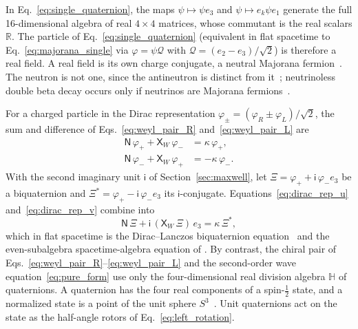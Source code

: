 \documentclass[aps,prd,onecolumn,tightenlines,nofootinbib,notitlepage,11pt,floatfix]{revtex4-2}
\theoremstyle{indentedtheorem}
\begin{document}
In Eq.~\eqref{eq:single_quaternion}, the maps $\psi\mapsto\psi e_3$ and $\psi\mapsto e_k\psi e_1$ generate the full 16-dimensional algebra of real $4\times 4$ matrices, whose commutant is the real scalars $\mathbb{R}$. The particle of Eq.~\eqref{eq:single_quaternion} (equivalent in flat spacetime to Eq.~\eqref{eq:majorana_single} via $\varphi = \psi\mathcal{Q}$ with $\mathcal{Q}=(e_2-e_3)/\sqrt{2}$) is therefore a real field. A real field is its own charge conjugate, a neutral Majorana fermion~\citep{Majorana1937Teoria,ArodzSwierczynski2021Majorana}. The neutron is not one, since the antineutron is distinct from it~\citep{Cork1956Antineutrons}; neutrinoless double beta decay occurs only if neutrinos are Majorana fermions~\citep{Avignone2008Double}.

For a charged particle in the Dirac representation $\varphi_\pm = (\varphi_R\pm\varphi_L)/\sqrt{2}$, the sum and difference of Eqs.~\eqref{eq:weyl_pair_R} and~\eqref{eq:weyl_pair_L} are
\begin{align}
    \mathsf{N} \, \varphi_+ + \mathsf{X}_W \, \varphi_- &= \kappa \, \varphi_+ , \label{eq:dirac_rep_u} \\
    \mathsf{N} \, \varphi_- + \mathsf{X}_W \, \varphi_+ &= -\kappa \, \varphi_- . \label{eq:dirac_rep_v}
\end{align}
With the second imaginary unit $\mathsf{i}$ of Section~\ref{sec:maxwell}, let $\Xi = \varphi_+ + \mathsf{i}\,\varphi_- e_3$ be a biquaternion and $\Xi^* = \varphi_+ - \mathsf{i}\,\varphi_- e_3$ its $\mathsf{i}$-conjugate. Equations~\eqref{eq:dirac_rep_u} and~\eqref{eq:dirac_rep_v} combine into
\begin{equation}
    \mathsf{N} \, \Xi + \mathsf{i} \, (\mathsf{X}_W \, \Xi) \, e_3 = \kappa \, \Xi^{*} ,
    \label{eq:biquaternion_single}
\end{equation}
which in flat spacetime is the Dirac--Lanczos biquaternion equation~\citep{Lanczos1929Tensoranalytischen,GsponerHurni2002Heritage} and the even-subalgebra spacetime-algebra equation of \citet{Hestenes1967Real,Hestenes1990Zitterbewegung}. By contrast, the chiral pair of Eqs.~\eqref{eq:weyl_pair_R}--\eqref{eq:weyl_pair_L} and the second-order wave equation~\eqref{eq:pure_form} use only the four-dimensional real division algebra $\mathbb{H}$ of quaternions. A quaternion has the four real components of a spin-$\tfrac{1}{2}$ state, and a normalized state is a point of the unit sphere $S^3$~\citep{MosseriDandoloff2001Geometry}. Unit quaternions act on the state as the half-angle rotors of Eq.~\eqref{eq:left_rotation}.
\end{document}
